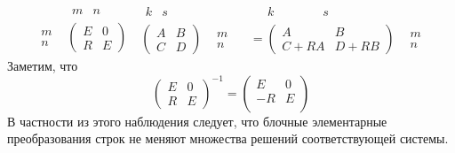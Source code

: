 \[
\begin{matrix}
{}&{
\begin{matrix}
{m}&{n}
\end{matrix}}\\
{
\begin{matrix}
{m}\\
{n}
\end{matrix}}&{
\begin{pmatrix}
{E}&{0}\\
{R}&{E}
\end{pmatrix}}
\end{matrix}
\;
\begin{matrix}
{
\begin{matrix}
{k}&{s}
\end{matrix}
}&{
}\\
{
\begin{pmatrix}
{A}&{B}\\
{C}&{D}
\end{pmatrix}
}&{
\begin{matrix}
{m}\\
{n}
\end{matrix}
}
\end{matrix}
\;\;
\begin{matrix}
{
\begin{matrix}
{\phantom{dd}k\phantom{dddddd}}&{s}
\end{matrix}
}&{
}\\
{
=
\begin{pmatrix}
{A}&{B}\\
{C+RA}&{D+RB}
\end{pmatrix}
}&{
\begin{matrix}
{m}\\
{n}
\end{matrix}
}
\end{matrix}
\]
Заметим, что
\[
\begin{pmatrix}
{E}&{0}\\
{R}&{E}
\end{pmatrix}^{-1}
=
\begin{pmatrix}
{E}&{0}\\
{-R}&{E}\\
\end{pmatrix}
\]
В частности из этого наблюдения следует, что блочные элементарные преобразования строк не меняют множества решений соответствующей системы.

